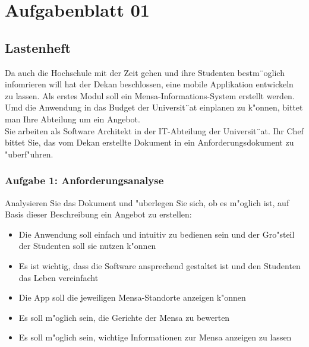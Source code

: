 

\chapter{Aufgabenblatt 01}
\section{Lastenheft}
Da auch die Hochschule mit der Zeit gehen und ihre Studenten bestm¨oglich infomrieren will hat der Dekan beschlossen, eine mobile Applikation entwickeln zu lassen.
Als erstes Modul soll ein Mensa-Informations-System erstellt werden.
Umd die Anwendung in das Budget der Universit¨at einplanen zu k"onnen, bittet man Ihre Abteilung um ein Angebot.\\

\noindent
Sie arbeiten als Software Architekt in der IT-Abteilung der Universit¨at.
Ihr Chef bittet Sie, das vom Dekan erstellte Dokument in ein Anforderungsdokument zu "uberf"uhren.

\subsection{Aufgabe 1: Anforderungsanalyse}
Analysieren Sie das Dokument und "uberlegen Sie sich, ob es m"oglich ist, auf Basis dieser Beschreibung ein Angebot zu erstellen:
\begin{itemize}
    \item Die Anwendung soll einfach und intuitiv zu bedienen sein und der Gro"steil der Studenten soll sie nutzen k"onnen
    \item Es ist wichtig, dass die Software ansprechend gestaltet ist und den Studenten das Leben vereinfacht
    \item Die App soll die jeweiligen Mensa-Standorte anzeigen k"onnen
    \item Es soll m"oglich sein, die Gerichte der Mensa zu bewerten
    \item Es soll m"oglich sein, wichtige Informationen zur Mensa anzeigen zu lassen
\end{itemize}



